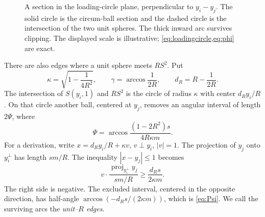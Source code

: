 \documentclass[11pt]{article}
\numberwithin{equation}{section}
\theoremstyle{definition}\newtheorem{definition}[theorem]{Definition}
\theoremstyle{remark}\newtheorem{remark}[theorem]{Remark}
\begin{document}
\begin{figure}[ht]
\centering
{}
\caption{A section in the loading-circle plane, perpendicular to $y_i-y_j$.
The solid circle is the circum-ball section and the dashed circle is the
intersection of the two unit spheres. The thick inward arc survives clipping.
The displayed scale is illustrative; \cref{eq:loadingcircle,eq:phi} are exact.}
\label{fig:clip}
\end{figure}

There are also edges where a unit sphere meets $RS^2$. Put
\begin{equation}\label{eq:kappagamma}
 \kappa=\sqrt{1-\frac1{4R^2}},\qquad
 \gamma=\arccos\frac1{2R},\qquad d_R=R-\frac1{2R}.
\end{equation}
The intersection of $S(y_i,1)$ and $RS^2$ is the circle of radius $\kappa$
with center $d_R y_i/R$. On that circle another ball, centered at $y_j$,
removes an angular interval of length $2\Psi$, where
\begin{equation}\label{eq:Psi}
 \Psi=\arccos\frac{(1-2R^2)s}{4R\kappa m}.
\end{equation}
For a derivation, write $x=d_Ry_i/R+\kappa v$, $v\perp y_i$, $|v|=1$.
The projection of $y_j$ onto $y_i^\perp$ has length $sm/R$.
The inequality $|x-y_j|\le1$ becomes
\[
 v\cdot\frac{\operatorname{proj}_{y_i^\perp}y_j}{sm/R}
 \ge \frac{d_Rs}{2\kappa m}.
\]
The right side is negative. The excluded interval, centered in the opposite
direction, has half-angle $\arccos(-d_Rs/(2\kappa m))$, which is
\cref{eq:Psi}. We call the surviving arcs the \emph{unit--$R$ edges}.
\end{document}
